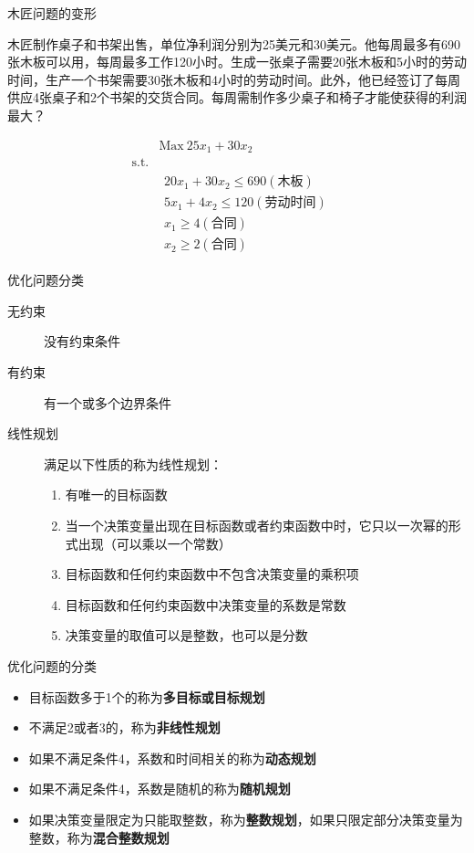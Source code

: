 \documentclass[UTF8]{ctexbeamer}
\begin{document}
\begin{frame}{木匠问题的变形}
  \begin{block}{}
木匠制作桌子和书架出售，单位净利润分别为25美元和30美元。他每周最多有690张木板可以用，每周最多工作120小时。生成一张桌子需要20张木板和5小时的劳动时间，生产一个书架需要30张木板和4小时的劳动时间。此外，他已经签订了每周供应4张桌子和2个书架的交货合同。每周需制作多少桌子和椅子才能使获得的利润最大？
  \end{block}

    \[ 
    \begin{array}{lcl}
      & \mbox{Max}\ 25x_1 + 30x_2 & \\
      \mbox{s.t.} & &  \\
      &
        \begin{array}{c}
          20x_1 + 30x_2 \le 690 (\text{木板})\\
          5x_1 + 4x_2 \le 120 (\text{劳动时间})\\
          x_1 \ge 4 (\text{合同})\\
          x_2 \ge 2 (\text{合同})
        \end{array}
        &
    \end{array}
    \]
  
\end{frame}

\begin{frame}{优化问题分类}
  \begin{description}
  \item[无约束] 没有约束条件
  \item[有约束] 有一个或多个边界条件
  \item[线性规划] 满足以下性质的称为线性规划：
    \begin{enumerate}
    \item 有唯一的目标函数
    \item 当一个决策变量出现在目标函数或者约束函数中时，它只以一次幂的形式出现（可以乘以一个常数）
    \item 目标函数和任何约束函数中不包含决策变量的乘积项
    \item 目标函数和任何约束函数中决策变量的系数是常数
    \item 决策变量的取值可以是整数，也可以是分数
    \end{enumerate}
  \end{description}
  
\end{frame}

\begin{frame}{优化问题的分类}
  \begin{itemize}
  \item 目标函数多于1个的称为\textbf{多目标或目标规划}
  \item 不满足2或者3的，称为\textbf{非线性规划}
  \item 如果不满足条件4，系数和时间相关的称为\textbf{动态规划}
  \item 如果不满足条件4，系数是随机的称为\textbf{随机规划}
  \item 如果决策变量限定为只能取整数，称为\textbf{整数规划}，如果只限定部分决策变量为整数，称为\textbf{混合整数规划}
  \end{itemize}
\end{frame}
\end{document}
